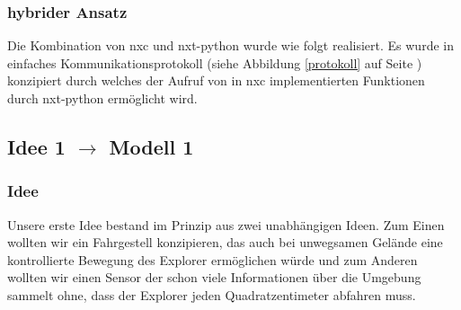 \documentclass[10pt,a4paper]{scrartcl}
\begin{document}
\subsubsection{hybrider Ansatz}
Die Kombination von nxc und nxt-python wurde wie folgt realisiert. Es wurde in einfaches Kommunikationsprotokoll (siehe Abbildung \ref{protokoll} auf Seite \pageref{protokoll}) konzipiert durch welches der Aufruf von in nxc implementierten Funktionen durch nxt-python ermöglicht wird.

\subsection{Idee 1 $\rightarrow$ Modell 1}%
\subsubsection{Idee}
Unsere erste Idee bestand im Prinzip aus zwei unabhängigen Ideen. Zum Einen wollten wir ein Fahrgestell konzipieren, das auch bei unwegsamen Gelände eine kontrollierte Bewegung des Explorer ermöglichen würde und zum Anderen wollten wir einen Sensor der schon viele Informationen über die Umgebung sammelt ohne, dass der Explorer jeden Quadratzentimeter abfahren muss.
\end{document}
